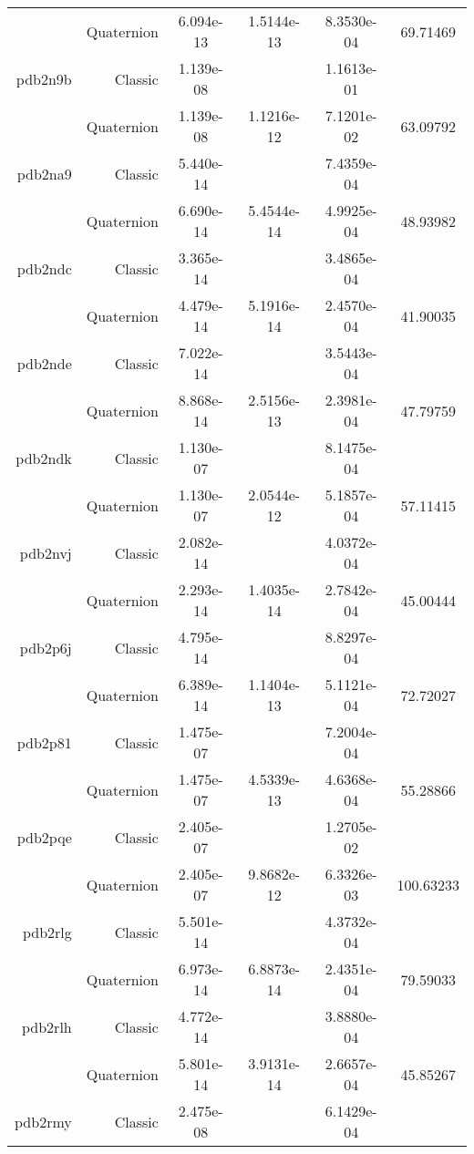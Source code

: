 \begin{xltabular}{\textwidth}{r|rS[table-format=1.3e+2]S[table-format=1.4e+2]S[table-format=1.4e+2]S[table-format=-1.5]}
& Quaternion & 6.094e-13 & 1.5144e-13 & 8.3530e-04 & 69.71469\\  \addlinespace
pdb2n9b & Classic & 1.139e-08 &  & 1.1613e-01 & \\
& Quaternion & 1.139e-08 & 1.1216e-12 & 7.1201e-02 & 63.09792\\  \addlinespace
pdb2na9 & Classic & 5.440e-14 &  & 7.4359e-04 & \\
& Quaternion & 6.690e-14 & 5.4544e-14 & 4.9925e-04 & 48.93982\\  \addlinespace
pdb2ndc & Classic & 3.365e-14 &  & 3.4865e-04 & \\
& Quaternion & 4.479e-14 & 5.1916e-14 & 2.4570e-04 & 41.90035\\  \addlinespace
pdb2nde & Classic & 7.022e-14 &  & 3.5443e-04 & \\
& Quaternion & 8.868e-14 & 2.5156e-13 & 2.3981e-04 & 47.79759\\  \addlinespace
pdb2ndk & Classic & 1.130e-07 &  & 8.1475e-04 & \\
& Quaternion & 1.130e-07 & 2.0544e-12 & 5.1857e-04 & 57.11415\\  \addlinespace
pdb2nvj & Classic & 2.082e-14 &  & 4.0372e-04 & \\
& Quaternion & 2.293e-14 & 1.4035e-14 & 2.7842e-04 & 45.00444\\  \addlinespace
pdb2p6j & Classic & 4.795e-14 &  & 8.8297e-04 & \\
& Quaternion & 6.389e-14 & 1.1404e-13 & 5.1121e-04 & 72.72027\\  \addlinespace
pdb2p81 & Classic & 1.475e-07 &  & 7.2004e-04 & \\
& Quaternion & 1.475e-07 & 4.5339e-13 & 4.6368e-04 & 55.28866\\  \addlinespace
pdb2pqe & Classic & 2.405e-07 &  & 1.2705e-02 & \\
& Quaternion & 2.405e-07 & 9.8682e-12 & 6.3326e-03 & 100.63233\\  \addlinespace
pdb2rlg & Classic & 5.501e-14 &  & 4.3732e-04 & \\
& Quaternion & 6.973e-14 & 6.8873e-14 & 2.4351e-04 & 79.59033\\  \addlinespace
pdb2rlh & Classic & 4.772e-14 &  & 3.8880e-04 & \\
& Quaternion & 5.801e-14 & 3.9131e-14 & 2.6657e-04 & 45.85267\\  \addlinespace
pdb2rmy & Classic & 2.475e-08 &  & 6.1429e-04 & \\

\end{xltabular}

